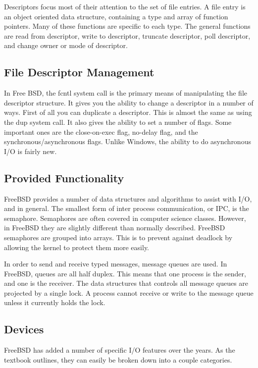 \documentclass[letterpaper,10pt,titlepage,draftclsnofoot,onecolumn]{IEEEtran}
\begin{document}
Descriptors focus most of their attention to the set of file entries. A file entry is an object oriented data structure, containing a type and array of function pointers. Many of these functions are specific to each type. The general functions are read from descriptor, write to descriptor, truncate descriptor, poll descriptor, and change owner or mode of descriptor. \cite{freebsd}

\subsection{File Descriptor Management}
In Free BSD, the fcntl system call is the primary means of manipulating the file descriptor structure. It gives you the ability to change a descriptor in a number of ways. First of all you can duplicate a descriptor. This is almost the same as using the dup system call. It also gives the ability to set a number of flags. Some important ones are the close-on-exec flag, no-delay flag, and the synchronous/asynchronous flags. \cite{freebsd} Unlike Windows, the ability to do asynchronous I/O is fairly new. 

\subsection{Provided Functionality}
FreeBSD provides a number of data structures and algorithms to assist with I/O, and in general. The smallest form of inter process communication, or IPC, is the semaphore. Semaphores are often covered in computer science classes. However, in FreeBSD they are slightly different than normally described. FreeBSD semaphores are grouped into arrays. This is to prevent against deadlock by allowing the kernel to protect them more easily. \cite{freebsd} 

In order to send and receive typed messages, message queues are used. In FreeBSD, queues are all half duplex. This means that one process is the sender, and one is the receiver. The data structures that controls all message queues are projected by a single lock. \cite{freebsd} A process cannot receive or write to the message queue unless it currently holds the lock.

\subsection{Devices}
FreeBSD has added a number of specific I/O features over the years. As the textbook outlines, they can easily be broken down into a couple categories.
\end{document}
